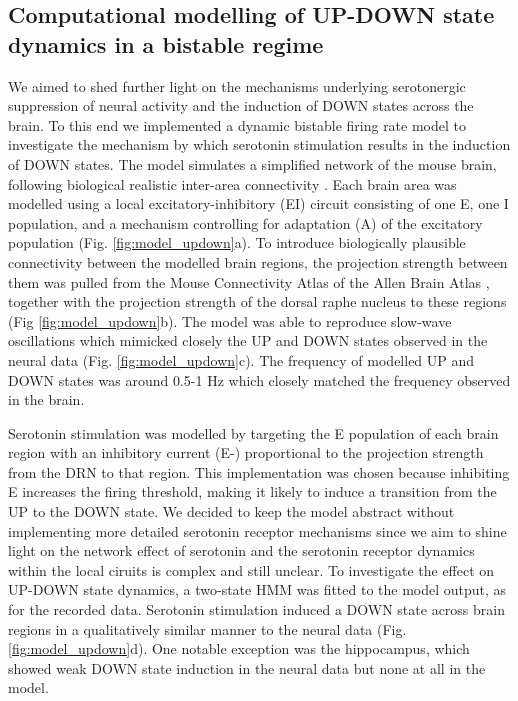 \documentclass[11pt,a4paper,onecolumn]{article}
\begin{document}
\subsection*{Computational modelling of UP-DOWN state dynamics in a bistable regime}
We aimed to shed further light on the mechanisms underlying serotonergic suppression of neural activity and the induction of DOWN states across the brain. To this end we implemented a dynamic bistable firing rate model to investigate the mechanism by which serotonin stimulation results in the induction of DOWN states. The model simulates a simplified network of the mouse brain, following biological realistic inter-area connectivity \citep{oh_mesoscale_2014, knox_high-resolution_2018}. Each brain area was modelled using a local excitatory-inhibitory (EI) circuit consisting of one E, one I population, and a mechanism controlling for adaptation (A) of the excitatory population  \citep{jercogUPDOWNCorticalDynamics2017} (Fig. \ref{fig:model_updown}a). To introduce biologically plausible connectivity between the modelled brain regions, the projection strength between them was pulled from the Mouse Connectivity Atlas of the Allen Brain Atlas \citep{oh_mesoscale_2014, knox_high-resolution_2018}, together with the projection strength of the dorsal raphe nucleus to these regions (Fig \ref{fig:model_updown}b). The model was able to reproduce slow-wave oscillations which mimicked closely the UP and DOWN states observed in the neural data (Fig. \ref{fig:model_updown}c). The frequency of modelled UP and DOWN states was around 0.5-1 Hz which closely matched the frequency observed in the brain. 

Serotonin stimulation was modelled by targeting the E population of each brain region with an inhibitory current (E-) proportional to the projection strength from the DRN to that region. This implementation was chosen because inhibiting E increases the firing threshold, making it likely to induce a transition from the UP to the DOWN state. We decided to keep the model abstract without implementing more detailed serotonin receptor mechanisms since we aim to shine light on the network effect of serotonin and the serotonin receptor dynamics within the local ciruits is complex and still unclear.
To investigate the effect on UP-DOWN state dynamics, a two-state HMM was fitted to the model output, as for the recorded data. Serotonin stimulation induced a DOWN state across brain regions in a qualitatively similar manner to the neural data (Fig. \ref{fig:model_updown}d). One notable exception was the hippocampus, which showed weak DOWN state induction in the neural data but none at all in the model.
 
\end{document}
